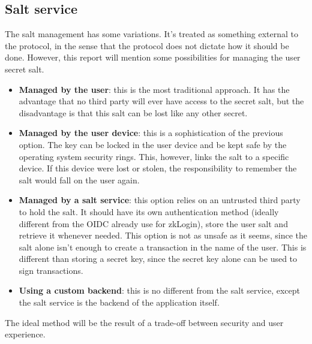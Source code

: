 \documentclass{article}
\begin{document}
\subsection{Salt service}
The salt management has some variations. It's treated as something external to the protocol, in the sense that the protocol does not dictate how it should be done. However, this report will mention some possibilities for managing the user secret salt.
\begin{itemize}
    \item \textbf{Managed by the user}: this is the most traditional approach. It has the advantage that no third party will ever have access to the secret salt, but the disadvantage is that this salt can be lost like any other secret.
    \item \textbf{Managed by the user device}: this is a sophistication of the previous option. The key can be locked in the user device and be kept safe by the operating system security rings. This, however, links the salt to a specific device. If this device were lost or stolen, the responsibility to remember the salt would fall on the user again.
    \item \textbf{Managed by a salt service}: this option relies on an untrusted third party to hold the salt. It should have its own authentication method (ideally different from the OIDC already use for zkLogin), store the user salt and retrieve it whenever needed. This option is not as unsafe as it seems, since the salt alone isn't enough to create a transaction in the name of the user. This is different than storing a secret key, since the secret key alone can be used to sign transactions.
    \item \textbf{Using a custom backend}: this is no different from the salt service, except the salt service is the backend of the application itself.
\end{itemize}

The ideal method will be the result of a trade-off between security and user experience.
\end{document}
